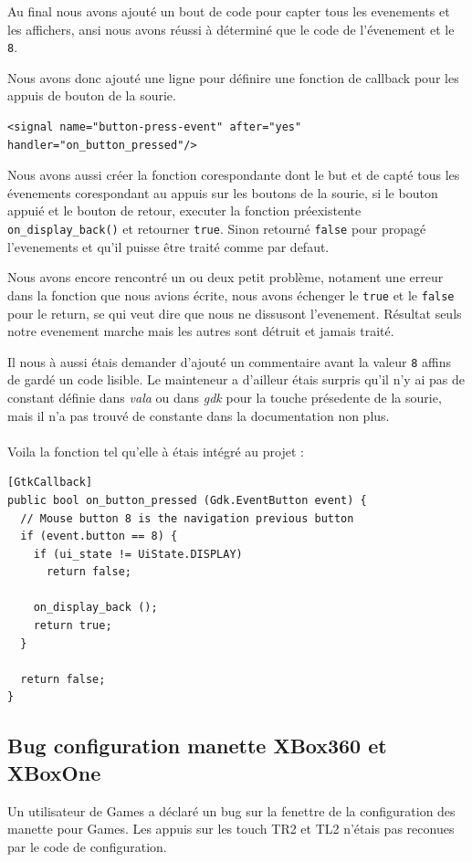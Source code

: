 \documentclass[12pt]{report}
\begin{document}
Au final nous avons ajouté un bout de code pour capter tous les evenements et
les affichers, ansi nous avons réussi à déterminé que le code de l'évenement
et le \texttt{8}.

Nous avons donc ajouté une ligne pour définire une fonction de callback pour
les appuis de bouton de la sourie.
\begin{verbatim}
<signal name="button-press-event" after="yes" handler="on_button_pressed"/>
\end{verbatim}

Nous avons aussi créer la fonction corespondante dont le but et de capté tous
les évenements corespondant au appuis sur les boutons de la sourie, si le
bouton appuié et le bouton de retour, executer la fonction préexistente
\texttt{on\_display\_back()} et retourner \texttt{true}.
Sinon retourné \texttt{false} pour propagé l'evenements et qu'il puisse être
traité comme par defaut.

Nous avons encore rencontré un ou deux petit problème, notament une erreur
dans la fonction que nous avions écrite, nous avons échenger le \texttt{true}
et le \texttt{false} pour le return, se qui veut dire que nous ne dissusont
l'evenement.
Résultat seuls notre evenement marche mais les autres sont détruit et jamais
traité.

Il nous à aussi étais demander d'ajouté un commentaire avant la valeur
\texttt{8} affins de gardé un code lisible. Le mainteneur a d'ailleur étais
surpris qu'il n'y ai pas de constant définie dans \textit{vala} ou dans
\textit{gdk} pour la touche présedente de la sourie, mais il n'a pas trouvé
de constante dans la documentation non plus. \\
\\
Voila la fonction tel qu'elle à étais intégré au projet :
\begin{verbatim}
[GtkCallback]
public bool on_button_pressed (Gdk.EventButton event) {
  // Mouse button 8 is the navigation previous button
  if (event.button == 8) {
    if (ui_state != UiState.DISPLAY)
      return false;

    on_display_back ();
    return true;
  }

  return false;
}
\end{verbatim}

\subsection{Bug configuration manette XBox360 et XBoxOne}
Un utilisateur de Games a déclaré un bug sur la fenettre de la configuration
des manette pour Games. Les appuis sur les touch TR2 et TL2 n'étais pas
reconues par le code de configuration.
\end{document}
